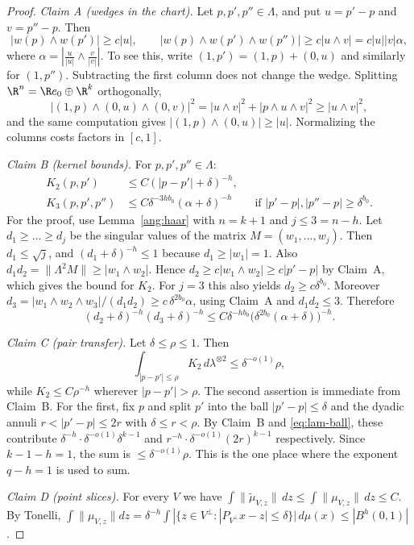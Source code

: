 \begin{proof}
\emph{Claim A (wedges in the chart).} Let $p,p',p''\in\Lambda$, and put $u=p'-p$ and $v=p''-p$. Then
\[
 |w(p)\wedge w(p')|\ge c|u|,\qquad |w(p)\wedge w(p')\wedge w(p'')|\ge c|u\wedge v|=c|u||v|\alpha,
\]
where $\alpha=|\frac{u}{|u|}\wedge\frac{v}{|v|}|$.
To see this, write $(1,p')=(1,p)+(0,u)$ and similarly for $(1,p'')$. Subtracting the first column does not change the wedge. Splitting $\R^n=\R e_0\oplus\R^k$ orthogonally,
\[
 |(1,p)\wedge(0,u)\wedge(0,v)|^2=|u\wedge v|^2+|p\wedge u\wedge v|^2\ge|u\wedge v|^2,
\]
and the same computation gives $|(1,p)\wedge(0,u)|\ge|u|$. Normalizing the columns costs factors in $[c,1]$.

\emph{Claim B (kernel bounds).} For $p,p',p''\in\Lambda$:
\begin{align*}
 K_2(p,p')&\le C(|p-p'|+\delta)^{-h},\\
 K_3(p,p',p'')&\le C\delta^{-3hb_0}(\alpha+\delta)^{-h}\qquad\text{if }|p'-p|,|p''-p|\ge\delta^{b_0}.
\end{align*}
For the proof, use Lemma~\ref{ang:haar} with $n=k+1$ and $j\le3=n-h$. Let $d_1\ge\dots\ge d_j$ be the singular values of the matrix $M=(w_1,\dots,w_j)$. Then $d_1\le\sqrt j$, and $(d_1+\delta)^{-h}\le1$ because $d_1\ge|w_1|=1$. Also $d_1d_2=\|\Lambda^2M\|\ge|w_1\wedge w_2|$. Hence $d_2\ge c|w_1\wedge w_2|\ge c|p'-p|$ by Claim~A, which gives the bound for $K_2$. For $j=3$ this also yields $d_2\ge c\delta^{b_0}$. Moreover $d_3=|w_1\wedge w_2\wedge w_3|/(d_1d_2)\ge c\,\delta^{2b_0}\alpha$, using Claim~A and $d_1d_2\le3$. Therefore
\[
 (d_2+\delta)^{-h}(d_3+\delta)^{-h}\le C\delta^{-hb_0}\bigl(\delta^{2b_0}(\alpha+\delta)\bigr)^{-h}.
\]

\emph{Claim C (pair transfer).} Let $\delta\le\rho\le1$. Then
\[
 \int_{|p-p'|\le\rho}K_2\,d\lambda^{\otimes2}\le\delta^{-o(1)}\rho,
\]
while $K_2\le C\rho^{-h}$ wherever $|p-p'|>\rho$.
The second assertion is immediate from Claim~B. For the first, fix $p$ and split $p'$ into the ball $|p'-p|\le\delta$ and the dyadic annuli $r<|p'-p|\le2r$ with $\delta\le r<\rho$. By Claim~B and \eqref{eq:lam-ball}, these contribute $\delta^{-h}\cdot\delta^{-o(1)}\delta^{k-1}$ and $r^{-h}\cdot\delta^{-o(1)}(2r)^{k-1}$ respectively. Since $k-1-h=1$, the sum is $\le\delta^{-o(1)}\rho$. This is the one place where the exponent $q-h=1$ is used to sum.

\emph{Claim D (point slices).} For every $V$ we have $\int\|\widetilde\mu_{V,z}\|\,dz\le\int\|\mu_{V,z}\|\,dz\le C$.
By Tonelli, $\int\|\mu_{V,z}\|dz=\delta^{-h}\int|\{z\in V^\perp:|P_{V^\perp}x-z|\le\delta\}|\,d\mu(x)\le|B^h(0,1)|$.


\end{proof}
